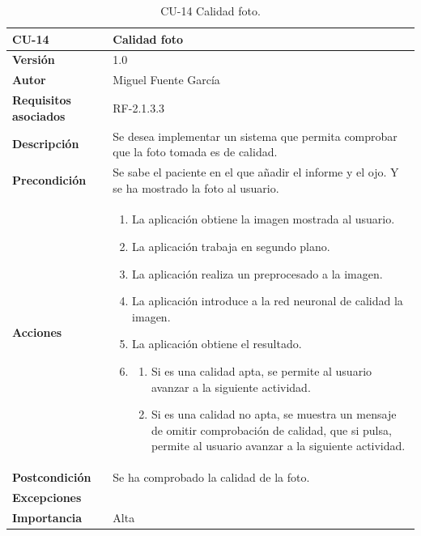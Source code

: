 \begin{table}[p]
	\centering
	\begin{tabularx}{\linewidth}{ p{} p{} }
		\toprule
		\textbf{CU-14}    & \textbf{Calidad foto}\\
		\toprule
		\textbf{Versión}              & 1.0    \\
		\textbf{Autor}                & Miguel Fuente García \\
		\textbf{Requisitos asociados} & RF-2.1.3.3 \\
		\textbf{Descripción}          & Se desea implementar un sistema que permita comprobar que la foto tomada es
de calidad. \\
		\textbf{Precondición}         & Se sabe el paciente en el que añadir el informe y el ojo. Y se ha mostrado la foto al usuario. \\
		\textbf{Acciones}             &
		\begin{enumerate}
			\def\labelenumi{\arabic{enumi}.}
			\tightlist
			\item La aplicación obtiene la imagen mostrada al usuario.
            \item La aplicación trabaja en segundo plano.
            \item La aplicación realiza un preprocesado a la imagen.
            \item La aplicación introduce a la red neuronal de calidad la imagen.
            \item La aplicación obtiene el resultado.
            \item \begin{enumerate}
                \item Si es una calidad apta, se permite al usuario avanzar a la siguiente actividad.
                \item Si es una calidad no apta, se muestra un mensaje de omitir comprobación de calidad, que si pulsa, permite al usuario avanzar a la siguiente actividad.
            \end{enumerate}
		\end{enumerate}\\
		\textbf{Postcondición}        & Se ha comprobado la calidad de la foto. \\
		\textbf{Excepciones}          &  \\
		\textbf{Importancia}          & Alta  \\
		\bottomrule
	\end{tabularx}
	\caption{CU-14 Calidad foto.}
\end{table}


